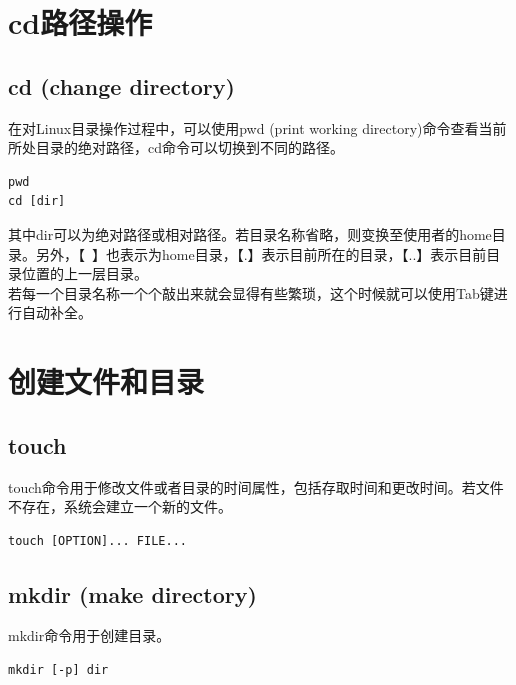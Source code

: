 \documentclass[12pt, openany, oneside]{book}
\begin{document}
\newpage

\section{cd路径操作}

\subsection{cd (change directory)}

在对Linux目录操作过程中，可以使用pwd (print working directory)命令查看当前所处目录的绝对路径，cd命令可以切换到不同的路径。

\vspace{-0.5cm}
\begin{lstlisting}
pwd
cd [dir]
\end{lstlisting}

其中dir可以为绝对路径或相对路径。若目录名称省略，则变换至使用者的home目录。另外，【~】也表示为home目录，【.】表示目前所在的目录，【..】表示目前目录位置的上一层目录。 \\

若每一个目录名称一个个敲出来就会显得有些繁琐，这个时候就可以使用Tab键进行自动补全。

\newpage

\section{创建文件和目录}

\subsection{touch}

touch命令用于修改文件或者目录的时间属性，包括存取时间和更改时间。若文件不存在，系统会建立一个新的文件。

\vspace{-0.5cm}
\begin{lstlisting}
touch [OPTION]... FILE...
\end{lstlisting}

\subsection{mkdir (make directory)}

mkdir命令用于创建目录。

\vspace{-0.5cm}
\begin{lstlisting}
mkdir [-p] dir
\end{lstlisting}
\end{document}
